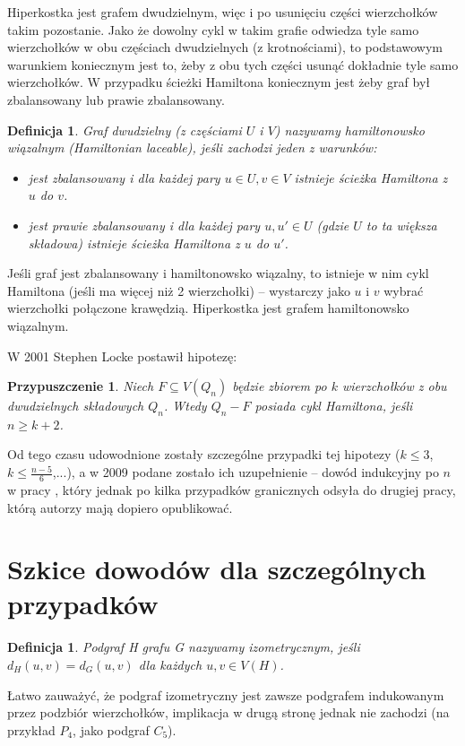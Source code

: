 \documentclass{pracamgr}
\newtheorem{defi}[theorem]{Definicja}
\newtheorem{conjecture}[theorem]{Przypuszczenie}
\begin{document}
   Hiperkostka jest grafem dwudzielnym, więc i po usunięciu części wierzchołków takim pozostanie.
   Jako że dowolny cykl w takim grafie odwiedza tyle samo wierzchołków w obu częściach dwudzielnych (z krotnościami),
   to podstawowym warunkiem koniecznym jest to, żeby z obu tych części usunąć dokładnie tyle samo wierzchołków.
   W przypadku ścieżki Hamiltona koniecznym jest żeby graf był zbalansowany lub prawie zbalansowany.
   
   \begin{defi}\label{Hamiltonian lacable}
    Graf dwudzielny (z częściami $U$ i $V$) nazywamy hamiltonowsko wiązalnym (Hamiltonian laceable), jeśli zachodzi jeden z warunków:
    \begin{itemize}
     \item jest zbalansowany i dla każdej pary $u\in U,v\in V$ istnieje ścieżka Hamiltona z $u$ do $v$.
     \item jest prawie zbalansowany i dla każdej pary $u,u'\in U$ (gdzie $U$ to ta większa składowa) istnieje ścieżka Hamiltona
      z $u$ do $u'$.
    \end{itemize}
   \end{defi}
   \noindent
   Jeśli graf jest zbalansowany i hamiltonowsko wiązalny, to istnieje w nim cykl Hamiltona (jeśli ma więcej niż 2 wierzchołki) -- wystarczy jako $u$ i $v$ wybrać
   wierzchołki połączone krawędzią.\newline
   Hiperkostka jest grafem hamiltonowsko wiązalnym.\newline

   W 2001 Stephen Locke postawił hipotezę:
   \begin{conjecture}\label{Locke conjecture}
    Niech $F\subseteq V(Q_n)$ będzie zbiorem po $k$ wierzchołków z obu dwudzielnych składowych $Q_n$. Wtedy $Q_n-F$ posiada cykl Hamiltona, jeśli
    $n\ge k+2$.
   \end{conjecture}
   Od tego czasu udowodnione zostały szczególne przypadki tej hipotezy ($k\le3$, $k\le\frac{n-5}{6}$,...),
   a w 2009 podane zostało ich uzupełnienie -- dowód indukcyjny po $n$ w pracy \cite{Locke}, który jednak po kilka przypadków granicznych odsyła
   do drugiej pracy, którą autorzy mają dopiero opublikować.
   
  \section{Szkice dowodów dla szczególnych przypadków}
   \begin{defi}\label{podgraf izometryczny}
    Podgraf H grafu G nazywamy \emph{izometrycznym}, jeśli $d_H(u,v)=d_G(u,v)$ dla każdych $u,v\in V(H)$.
   \end{defi}
   Łatwo zauważyć, że podgraf izometryczny jest zawsze podgrafem indukowanym przez podzbiór wierzchołków,
   implikacja w drugą stronę jednak nie zachodzi (na przykład $P_4$, jako podgraf $C_5$).
\end{document}
